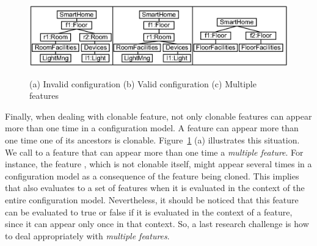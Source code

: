 


\begin{figure}
  \centering \includegraphics[width=.7\linewidth]{Figures/contexts(2).eps} \\
  \caption{(a) Invalid configuration (b) Valid configuration (c) Multiple features}
  \label{fig:contexts}
\end{figure}

Finally, when dealing with clonable feature, not only clonable features can appear more than one time in a configuration model. A feature can appear more than one time one of its ancestors is clonable. Figure~\ref{fig:contexts} (a) illustrates this situation. We call to a feature that can appear more than one time a \emph{multiple feature}. For instance, the feature , which is not clonable itself,  might appear several times in a configuration model as a consequence of the  feature being cloned. This implies that  also evaluates to a set of features when it is evaluated in the context of the entire configuration model. Nevertheless, it should be noticed that this feature can be evaluated to true or false if it is evaluated in the context of a  feature, since it can appear only once in that context. So, a last research challenge is how to deal appropriately with \emph{multiple features}.

